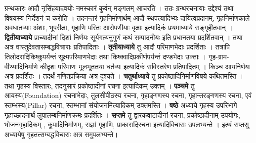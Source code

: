 ग्रन्थकारः आदौ नृसिंहयादवयोः नमस्कारं कुर्वन् मङ्गलम् आचरति । ततः ग्रन्थरचनायाः उद्देश्यं तथा विषयस्य निर्देशनं च करोति । तदनन्तरं गृहनिर्माणार्थम् आदौ स्थपत्यादिभ्यः दायित्वप्रदानम्, गृहनिर्माणकाले अवधातव्याः अंशाः, भूपरीक्षा, गृहाणि परितः आरोपणीयाः वृक्षाः इत्यादिकं प्रथमाध्याये सङ्गृहीतवान् । {\b\bfseries द्वितीयाध्याये} प्राच्यादीनां दिशां निर्णयः सूर्यगत्यनुगुणं कथं सम्पादनीयः इति प्रधानतया प्रदर्शितवान् । तथा अत्र वास्तुदेवतासम्बद्धविचाराः प्रतिपादिताः । {\b\bfseries तृतीयाध्याये} तु आदौ परिमाणभेदाः प्रदर्शिताः । तत्रापि तिलोदरादिकिष्कुपर्यन्तं सूक्ष्मपरिमाणभेदाः तथा किष्क्वादिप्रकीर्णपर्यन्तं दण्डभेदाः उक्ताः । गृह-ग्राम-वीथ्यादिनिर्माणे कीदृशः परिमाणः मूलभूततया धर्तव्यः इत्यादिकं सविस्तरेण प्रतिपादितम् । किञ्च आयनिर्णयः अत्र प्रदर्शितः । तदर्थं गणितप्रक्रिया अत्र दृश्यते । {\b\bfseries चतुर्थाध्याये} तु प्रकोष्ठादिनिर्माणविषये कथितमस्ति । तथा गृहस्य विस्तारः, तदनुसारं प्रकोष्ठादीनां रचना इत्यादिकम् उक्तम् । {\b\bfseries पञ्चमे} तु आयस्य(Foundation) रचनाभेदाः, तुलसीपीठस्य रचना, गृहाङ्गणस्य रचना, गृहान्तरङ्गणस्य रचना, एवं स्तम्भस्य(Pillar) रचना, स्तम्भानां संयोजनमित्यादिकम् उक्तमस्ति । {\b\bfseries षष्ठे} अध्याये गृहस्य उपरिभागे गृहाच्छादनार्थं लुपालम्बनिर्माणक्रमः प्रदर्शितः । {\b\bfseries सप्तमे} तु द्वारकवाटादीनां रचना, प्रकोष्ठादीनाम् उपयोगः, भोजनगृहादिकम् , कूपादिनिर्माणम्, राज्ञां गृहाणि, प्राकारादिरचना इत्यादिविचाराः उपलभ्यन्ते । इत्थं सप्तसु अध्यायेषु गृहतत्सम्बद्धविचाराः अत्र समुपलभ्यन्ते।
